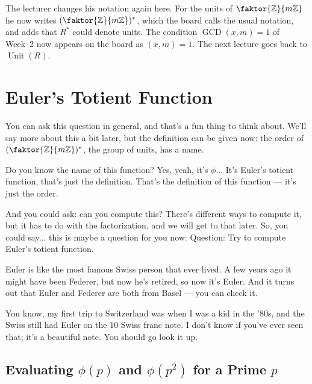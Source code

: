 \begin{aiNote}
The lecturer changes his notation again here. For the units of $\faktor{\mathbb{Z}}{m\mathbb{Z}}$ he now writes $(\faktor{\mathbb{Z}}{m\mathbb{Z}})^*$, which the board calls the usual notation, and adds that $R^*$ could denote units. The condition $\operatorname{GCD}(x, m) = 1$ of Week~2 now appears on the board as $(x, m) = 1$. The next lecture goes back to $\operatorname{Unit}(R)$.
\end{aiNote}

\section{Euler's Totient Function}

\begin{speech}[00:10:36 - 00:12:03]
You can ask this question in general, and that's a fun thing to think about. We'll say more about this a bit later, but the definition can be given now:  the order of $(\faktor{\mathbb{Z}}{m\mathbb{Z}})^*$, the group of units, has a name.

Do you know the name of this function? Yes, yeah, it's $\phi$... It's Euler's totient function, that's just the definition. That's the definition of this function --- it's just the order.

And you could ask: can you compute this? There's different ways to compute it, but it has to do with the factorization, and we will get to that later. So, you could say... this is maybe a question for you now:  Question: Try to compute Euler's totient function.

Euler is like the most famous Swiss person that ever lived. A few years ago it might have been Federer, but now he's retired, so now it's Euler. And it turns out that Euler and Federer are both from Basel --- you can check it.

You know, my first trip to Switzerland was when I was a kid in the '80s, and the Swiss still had Euler on the $10$ Swiss franc note. I don't know if you've ever seen that; it's a beautiful note. You should go look it up.
\end{speech}

\subsection{Evaluating \texorpdfstring{$\phi(p)$}{phi(p)} and \texorpdfstring{$\phi(p^2)$}{phi(p\texttwosuperior)} for a Prime \texorpdfstring{$p$}{p}}

